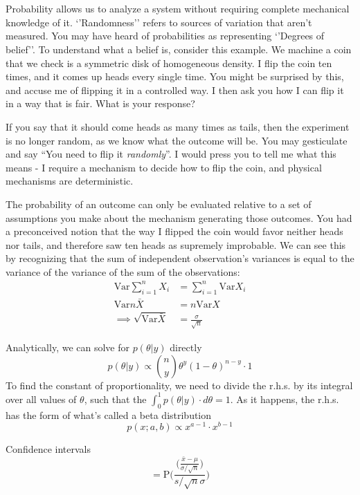\documentclass[11pt,a4paper,article]{memoir} %
\begin{document}
\chapter{}
Probability allows us to analyze a system without requiring complete mechanical knowledge of it. `'Randomness'' refers to sources of variation that aren't measured. You may have heard of probabilities as representing `'Degrees of belief''. To understand what a belief is, consider this example. We machine a coin that we check is a symmetric disk of homogeneous density. I flip the coin ten times, and it comes up heads every single time. You might be surprised by this, and accuse me of flipping it in a controlled way. I then ask you how I can flip it in a way that is fair. What is your response?
\par
If you say that it should come heads as many times as tails, then the experiment is no longer random, as we know what the outcome will be. You may gesticulate and say ``You need to flip it \emph{randomly}''. I would press you to tell me what this means - I require a mechanism to decide how to flip the coin, and physical mechanisms are deterministic.
\par
The probability of an outcome can only be evaluated relative to a set of assumptions you make about the mechanism generating those outcomes. You had a preconceived notion that the way I flipped the coin would favor neither heads nor tails, and therefore saw ten heads as supremely improbable.
\newpage
We can see this by recognizing that the sum of independent observation's variances is equal to the variance of the variance of the sum of the observations:
\begin{align}
 \text{Var}\sum_{i = 1}^n X_i &= \sum_{i = 1}^n \text{Var}X_i\\
	\text{Var}n\bar{X} &= n\text{Var}X \\
	\implies \sqrt{\text{Var}\bar{X}} &= \frac{\sigma}{\sqrt{n}}
\end{align}
\par
Analytically, we can solve for $p(\theta|y)$ directly
\[
  p(\theta|y) \propto \binom{n}{y}\theta^y (1 - \theta)^{n-y}\cdot 1
\]
To find the constant of proportionality, we need to divide the r.h.s. by its integral over all values of $\theta$, such that the $\int_0^1 p(\theta|y)\cdot d\theta = 1$. As it happens, the r.h.s. has the form of what's called a beta distribution
\[
  p(x; a, b) \propto x^{a - 1}\cdot x^{b-1}
\]

Confidence intervals
\[
	 = \text{P}\Bigg(\frac{\Big(\frac{\bar{x} - \mu}{\sigma/\sqrt{n}}\Big)}{s/\sqrt{n}\sigma}\Bigg)
\]
\end{document}

